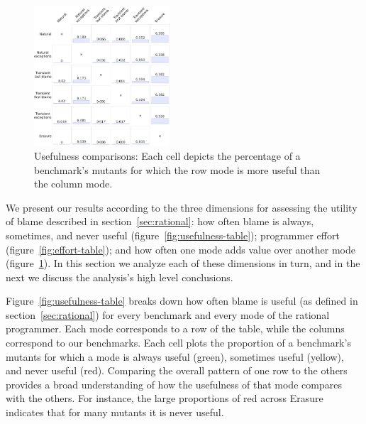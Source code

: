 \begin{figure}
  \centering
  \includegraphics[width=0.45\textwidth]{./plots/avo-matrix}
  \caption{Usefulness comparisons: Each cell depicts the percentage of a
  benchmark's mutants for which the row mode is more useful than the column mode.}
  \label{fig:avo-matrix}
\end{figure}

We present our results according to the three dimensions for assessing the utility of blame described in section~\ref{sec:rational}: how often blame is always, sometimes, and never useful (figure~\ref{fig:usefulness-table}); programmer effort (figure~\ref{fig:effort-table}); and how often one mode adds value over another mode (figure~\ref{fig:avo-matrix}).
In this section we analyze each of these dimensions in turn, and in the next we discuss the analysis's high level conclusions.

Figure~\ref{fig:usefulness-table} breaks down how often blame is useful (as defined in section~\ref{sec:rational}) for every benchmark and every mode of the rational programmer.
Each mode corresponds to a row of the table, while the columns correspond to our benchmarks.
Each cell plots the proportion of a benchmark's mutants for which a mode is always useful (green), sometimes useful (yellow), and never useful (red).
Comparing the overall pattern of one row to the others provides a broad understanding of how the usefulness of that mode compares with the others.
For instance, the large proportions of red across Erasure indicates that for many mutants it is never useful.

